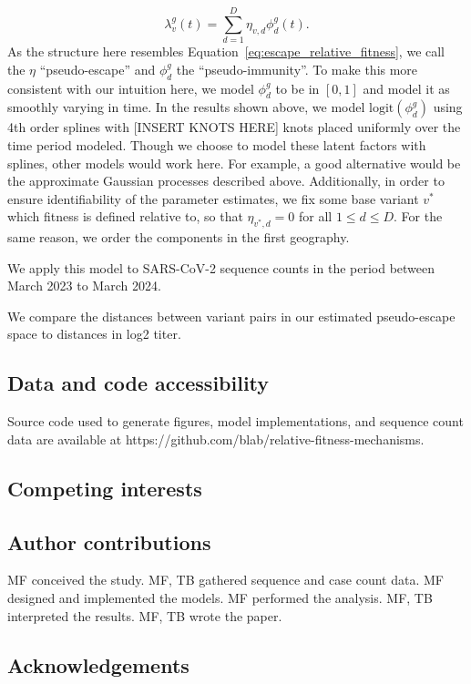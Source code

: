 \documentclass[12pt,oneside,letterpaper]{article}
\begin{document}
\begin{equation}
    \lambda_{v}^{g}(t) = \sum_{d=1}^{D} \eta_{v,d} \phi_{d}^{g}(t).
\end{equation}
As the structure here resembles Equation~\ref{eq:escape_relative_fitness}, we call the $\eta$ ``pseudo-escape'' and $\phi_{d}^{g}$ the ``pseudo-immunity''.
To make this more consistent with our intuition here, we model $\phi_{d}^{g}$ to be in $[0,1]$ and model it as smoothly varying in time.
In the results shown above, we model $\text{logit}(\phi_{d}^{g})$ using 4th order splines with [INSERT KNOTS HERE] knots placed uniformly over the time period modeled.
Though we choose to model these latent factors with splines, other models would work here. For example, a good alternative would be the approximate Gaussian processes described above.
Additionally, in order to ensure identifiability of the parameter estimates, we fix some base variant $v^*$ which fitness is defined relative to, so that $\eta_{v^*, d} = 0$ for all $1\leq d\leq D$.
For the same reason, we order the components in the first geography.

We apply this model to SARS-CoV-2 sequence counts in the period between March 2023 to March 2024.

We compare the distances between variant pairs in our estimated pseudo-escape space to distances in log2 titer.

\subsection*{Data and code accessibility}

Source code used to generate figures, model implementations, and sequence count data are available at https://github.com/blab/relative-fitness-mechanisms.

\subsection*{Competing interests}%

\subsection*{Author contributions}
MF conceived the study.
MF, TB gathered sequence and case count data.
MF designed and implemented the models.
MF performed the analysis.
MF, TB interpreted the results.
MF, TB wrote the paper.


\subsection*{Acknowledgements}%
\end{document}
